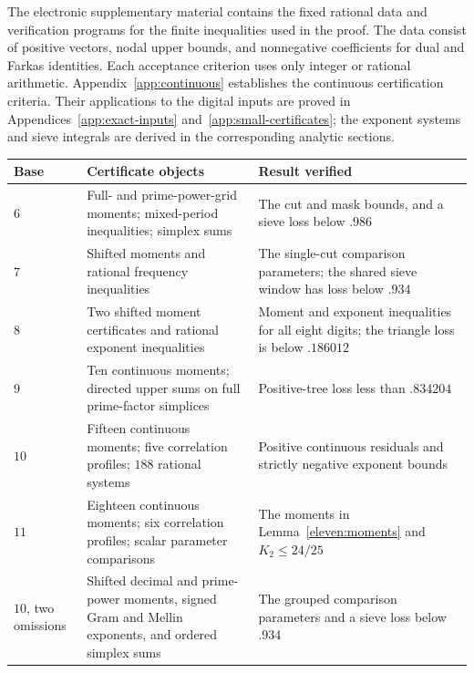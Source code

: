 \documentclass[11pt,a4paper]{article}
\theoremstyle{paperplain}
\numberwithin{equation}{section}
\begin{document}
The electronic supplementary material contains the fixed rational data and
verification programs for the finite inequalities used in the proof.
The data consist of positive vectors, nodal upper bounds, and nonnegative
coefficients for dual and Farkas identities. Each acceptance criterion uses
only integer or rational arithmetic. Appendix~\ref{app:continuous} establishes the continuous certification
criteria. Their applications to the digital inputs are proved in
Appendices~\ref{app:exact-inputs} and~\ref{app:small-certificates}; the
exponent systems and sieve integrals are derived in the corresponding
analytic sections.

\begin{center}
\begin{tabular}{>{\raggedright\arraybackslash}p{}
 >{\raggedright\arraybackslash}p{}
 >{\raggedright\arraybackslash}p{}}
\toprule
Base & Certificate objects & Result verified\\
\midrule
$6$ & Full- and prime-power-grid moments; mixed-period inequalities; simplex sums
 & The cut and mask bounds, and a sieve loss below $.986$\\
$7$ & Shifted moments and rational frequency inequalities
 & The single-cut comparison parameters; the shared sieve window has loss below $.934$\\
$8$ & Two shifted moment certificates and rational exponent inequalities
 & Moment and exponent inequalities for all eight digits; the triangle loss is below $.186012$\\
$9$ & Ten continuous moments; directed upper sums on full prime-factor simplices
 & Positive-tree loss less than $.834204$\\
$10$ & Fifteen continuous moments; five correlation profiles; $188$ rational systems
 & Positive continuous residuals and strictly negative exponent bounds\\
$11$ & Eighteen continuous moments; six correlation profiles; scalar parameter comparisons
 & The moments in Lemma~\ref{eleven:moments} and $K_2\leqslant24/25$\\
$10$, two omissions & Shifted decimal and prime-power moments,
signed Gram and Mellin exponents, and ordered simplex sums
 & The grouped comparison parameters and a sieve loss below $.934$\\
\bottomrule
\end{tabular}
\end{center}
\end{document}
